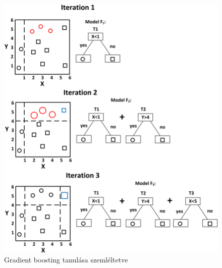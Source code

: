 \begin{figure}[h]
    \centering
    \includegraphics[scale=0.45]{images/3.fejezet/GradientBoosting.png}
    \caption{Gradient boosting tanulása szemléltetve \cite{gradient_abra}}
    \label{fig:gradientboosting}
\end{figure}